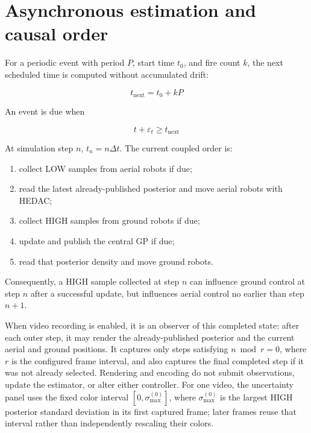 \documentclass[11pt]{article}
\begin{document}
\section{Asynchronous estimation and causal order}


For a periodic event with period $P$, start time $t_0$, and fire count $k$, the next scheduled time is computed without accumulated drift:


\begin{equation}
t_{\mathrm{next}}=t_0+kP
\end{equation}


An event is due when


\begin{equation}
t+\varepsilon_t\ge t_{\mathrm{next}}
\end{equation}


At simulation step $n$, $t_n=n\Delta t$. The current coupled order is:


\begin{enumerate}
\item collect LOW samples from aerial robots if due;
\item read the latest already-published posterior and move aerial robots with HEDAC;
\item collect HIGH samples from ground robots if due;
\item update and publish the central GP if due;
\item read that posterior density and move ground robots.
\end{enumerate}


Consequently, a HIGH sample collected at step $n$ can influence ground control at step $n$ after a successful update, but influences aerial control no earlier than step $n+1$.


When video recording is enabled, it is an observer of this completed state:
after each outer step, it may render the already-published posterior and the
current aerial and ground positions. It captures only steps satisfying
$n \bmod r=0$, where $r$ is the configured frame interval, and also captures
the final completed step if it was not already selected. Rendering and encoding
do not submit observations, update the estimator, or alter either controller.
For one video, the uncertainty panel uses the fixed color interval
$[0,\sigma_{\max}^{(0)}]$, where $\sigma_{\max}^{(0)}$ is the largest HIGH
posterior standard deviation in its first captured frame; later frames reuse
that interval rather than independently rescaling their colors.
\end{document}

